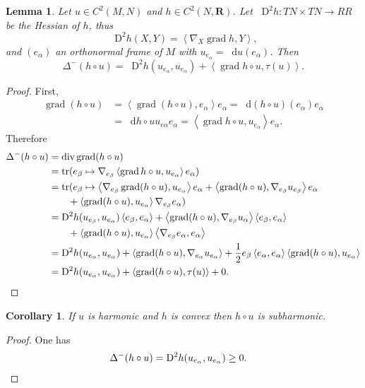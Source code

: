 \documentclass[reqno,12pt,letterpaper]{amsart}
\newcommand{\RR}{\mathbf{R}}
\newcommand{\tr}{\operatorname{tr}}
\newcommand*\dif{\mathop{}\!\mathrm{d}}
\newcommand*\Dif{\mathop{}\!\mathrm{D}}
\DeclareMathOperator{\Div}{div}
\DeclareMathOperator{\grad}{grad}
\newcommand{\bral}{\left\langle}
\newcommand{\brar}{\right\rangle}
\newtheorem{lemma}[theorem]{Lemma}
\newtheorem{corollary}[theorem]{Corollary}
\theoremstyle{definition}
\numberwithin{equation}{section}
\begin{document}
\begin{lemma}
Let $u \in C^2(M, N)$ and $h \in C^2(N, \RR)$.
Let $\Dif^2h: TN \times TN \to RR$ be the Hessian of $h$, thus 
$$\Dif^2 h(X, Y) = \bral \nabla_X \grad h, Y\brar,$$
and $(e_\alpha)$ an orthonormal frame of $M$ with $u_{e_\alpha} = \dif u(e_\alpha)$. Then
$$\Delta^-(h \circ u) = \Dif^2 h(u_{e_\alpha}, u_{e_\alpha}) + \bral \grad h \circ u, \tau(u) \brar.$$
\end{lemma}
\begin{proof}
First,
\begin{align*}
\grad(h \circ u) &= \bral \grad(h \circ u), e_\alpha \brar e_\alpha = \dif(h \circ u)(e_\alpha) e_\alpha \\
&= \dif h \circ u u_{e\alpha} e_\alpha = \bral \grad h \circ u, u_{e_\alpha} \brar e_\alpha.
\end{align*}
Therefore 
\begin{align*}
\Delta^- (h \circ u) &= \Div \grad (h \circ u) \\
&= \tr(e_\beta \mapsto \nabla_{e_\beta} \bral \grad h \circ u, u_{e_\alpha} \brar e_\alpha)\\
&= \tr(e_\beta \mapsto \bral \nabla_{e_\beta} \grad(h \circ u), u_{e_\alpha} \brar e_\alpha + \bral \grad(h \circ u), \nabla_{e_\beta} u_{e_\beta} \brar e_\alpha \\
&\qquad + \bral \grad(h \circ u), u_{e_\alpha} \brar \nabla_{e_\beta} e_\alpha) \\
&= \Dif^2 h(u_{e_\beta}, u_{e_\alpha}) \bral e_\beta, e_\alpha \brar + \bral \grad(h \circ u), \nabla_{e_\beta} u_\alpha \brar \bral e_\beta, e_\alpha \brar \\
&\qquad + \bral \grad (h \circ u), u_{e_\alpha} \brar \bral \nabla_{e_\beta} e_\alpha, e_\alpha \brar \\
&= \Dif^2 h(u_{e_\alpha}, u_{e_\alpha}) + \bral \grad(h \circ u), \nabla_{e_\alpha} u_{e_\alpha} \brar + \frac{1}{2} e_\beta \bral e_\alpha, e_\alpha \brar \bral \grad(h \circ u), u_{e_\alpha} \brar \\
&= \Dif^2 h(u_{e_\alpha}, u_{e_\alpha}) + \bral \grad(h \circ u), \tau(u) \brar + 0. \qedhere
\end{align*}
\end{proof}

\begin{corollary}
If $u$ is harmonic and $h$ is convex then $h \circ u$ is subharmonic.
\end{corollary}
\begin{proof}
One has 
\begin{align*}
\Delta^- (h \circ u) &= \Dif^2 h(u_{e_\alpha}, u_{e_\alpha}) \geq 0. \qedhere
\end{align*}
\end{proof}
\end{document}
